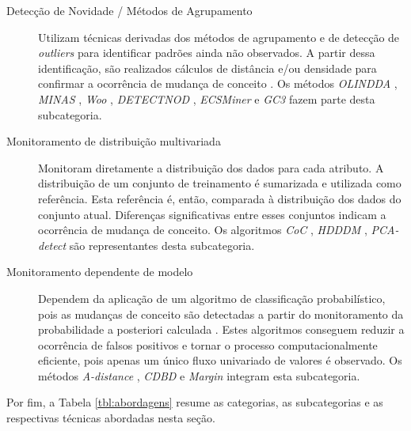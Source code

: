 \documentclass[qual, classic, a4paper]{ufbathesis}
\begin{document}
\begin{description}
    \item[Detecção de Novidade / Métodos de Agrupamento] 
    Utilizam técnicas derivadas dos métodos de agrupamento e de detecção de \textit{outliers} para identificar padrões ainda não observados.
    A partir dessa identificação, são realizados cálculos de distância e/ou densidade para confirmar a ocorrência de mudança de conceito \cite{Ryu:Kantardzic:2012}.
    Os métodos 
    \textit{OLINDDA} \cite{Spinosa:2007:OCA:1244002.1244107},
    \textit{MINAS} \cite{Faria:2013:NDA:2480362.2480515},
    \textit{Woo} \cite{Ryu:Kantardzic:2012},
    \textit{DETECTNOD} \cite{Hashemi:Hayat:DETECTNOD:2010},
    \textit{ECSMiner} \cite{Masud:2011:CNC:1978259.1978529} e
    \textit{GC3} \cite{Sethi2016b:GC3} fazem parte desta subcategoria.
    
    \item[Monitoramento de distribuição multivariada]
    Monitoram diretamente a distribuição dos dados para cada atributo.
    A distribuição de um conjunto de treinamento é sumarizada e utilizada como referência.
    Esta referência é, então, comparada à distribuição dos dados do conjunto atual.
    Diferenças significativas entre esses conjuntos indicam a ocorrência de mudança de conceito.
    Os algoritmos
    \textit{CoC} \cite{Lee:Magoules:CoC:2012},
    \textit{HDDDM} \cite{Ditzler:Polikar:HDDDM:2011},
    \textit{PCA-detect} \cite{Kuncheva:PCADetect:20085}
    são representantes desta subcategoria.

    \item[Monitoramento dependente de modelo]
    Dependem da aplicação de um algoritmo de classificação probabilístico, 
    pois as mudanças de conceito são detectadas a partir do monitoramento da probabilidade a posteriori calculada \cite{Zliobaite:2010}.
    Estes algoritmos conseguem reduzir a ocorrência de falsos positivos e tornar o processo computacionalmente eficiente, pois apenas um único fluxo univariado de valores é observado. 
    Os métodos 
    \textit{A-distance} \cite{Dredze:ADistance:2010585},
    \textit{CDBD} \cite{Lindstrom:CDBD:2013} e
    \textit{Margin} \cite{Dries:Margin:2009} integram esta subcategoria.
\end{description}

Por fim, a Tabela \ref{tbl:abordagens} resume as categorias, as subcategorias e as respectivas técnicas abordadas nesta seção.
\end{document}
